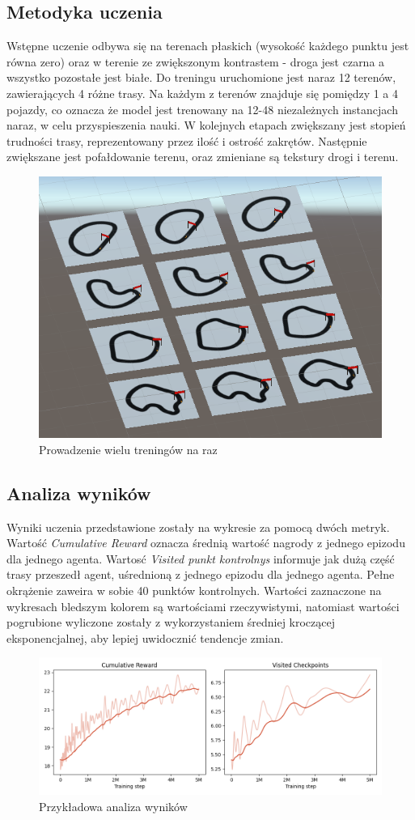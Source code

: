 \subsection{Metodyka uczenia}
Wstępne uczenie odbywa się na terenach płaskich (wysokość każdego punktu jest równa zero) oraz w terenie ze zwiększonym kontrastem - droga jest czarna a wszystko pozostałe jest białe. Do treningu uruchomione jest naraz 12 terenów, zawierających 4 różne trasy. Na każdym z terenów znajduje się pomiędzy 1 a 4 pojazdy, co oznacza że model jest trenowany na 12-48 niezależnych instancjach naraz, w celu przyspieszenia nauki. W kolejnych etapach zwiększany jest stopień trudności trasy, reprezentowany przez ilość i ostrość zakrętów. Następnie zwiększane jest pofałdowanie terenu, oraz zmieniane są tekstury drogi i terenu.
\begin{figure}[H]
    \centering
    \includegraphics[width=.5\textwidth]{figures/multiple_tests}
    \caption{Prowadzenie wielu treningów na raz}
    \label{fig}
\end{figure}

\subsection{Analiza wyników}
Wyniki uczenia przedstawione zostały na wykresie za pomocą dwóch metryk. Wartość \textit{Cumulative Reward} oznacza średnią wartość nagrody z jednego epizodu dla jednego agenta. Wartosć \textit{Visited punkt kontrolnys} informuje jak dużą część trasy przeszedł agent, uśrednioną z jednego epizodu dla jednego agenta. Pełne okrążenie zaweira w sobie 40 punktów kontrolnych. Wartości zaznaczone na wykresach bledszym kolorem są wartościami rzeczywistymi, natomiast wartości pogrubione wyliczone zostały z wykorzystaniem średniej kroczącej eksponencjalnej, aby lepiej uwidocznić tendencje zmian.

\begin{figure}[H]
    \centering
    \includegraphics[width=\textwidth]{graphs/example}
    \caption{Przykładowa analiza wyników}
    \label{fig}
\end{figure}

